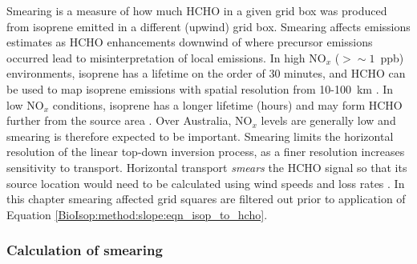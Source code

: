{    Smearing is a measure of how much HCHO in a given grid box was produced from isoprene emitted in a different (upwind) grid box.
    Smearing affects emissions estimates as HCHO enhancements downwind of where precursor emissions occurred lead to misinterpretation of local emissions.
    In high NO$_x$ ($ > \sim 1 $~ppb) environments, isoprene has a lifetime on the order of 30 minutes, and HCHO can be used to map isoprene emissions with spatial resolution from 10-100~km \parencite{Palmer2003}.
    In low NO$_x$ conditions, isoprene has a longer lifetime (hours) and may form HCHO further from the source area \parencite{Fan2004,Liu2016a,Liu2017_hpald}.
    Over Australia, NO$_x$ levels are generally low and smearing is therefore expected to be important.
    Smearing limits the horizontal resolution of the linear top-down inversion process, as a finer resolution increases sensitivity to transport.
    Horizontal transport \textit{smears} the HCHO signal so that its source location would need to be calculated using wind speeds and loss rates \parencite{Palmer2001,Palmer2003}.
    In this chapter smearing affected grid squares are filtered out prior to application of Equation \ref{BioIsop:method:slope:eqn_isop_to_hcho}.
    
    
    \subsubsection{Calculation of smearing}
    \label{Model:filter:smearing:calculation}
    
}
